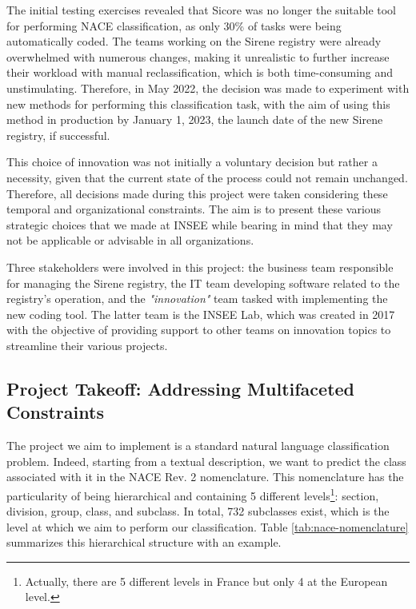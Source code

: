 The initial testing exercises revealed that Sicore was no longer the suitable tool for performing NACE classification, as only 30\% of tasks were being automatically coded. The teams working on the Sirene registry were already overwhelmed with numerous changes, making it unrealistic to further increase their workload with manual reclassification, which is both time-consuming and unstimulating. Therefore, in May 2022, the decision was made to experiment with new methods for performing this classification task, with the aim of using this method in production by January 1, 2023, the launch date of the new Sirene registry, if successful.

This choice of innovation was not initially a voluntary decision but rather a necessity, given that the current state of the process could not remain unchanged. Therefore, all decisions made during this project were taken considering these temporal and organizational constraints. The aim is to present these various strategic choices that we made at INSEE while bearing in mind that they may not be applicable or advisable in all organizations.

Three stakeholders were involved in this project: the business team responsible for managing the Sirene registry, the IT team developing software related to the registry's operation, and the \textit{"innovation"} team tasked with implementing the new coding tool. The latter team is the INSEE Lab, which was created in 2017 with the objective of providing support to other teams on innovation topics to streamline their various projects.

\subsection{Project Takeoff: Addressing Multifaceted Constraints}

The project we aim to implement is a standard natural language classification problem. Indeed, starting from a textual description, we want to predict the class associated with it in the NACE Rev. 2 nomenclature. This nomenclature has the particularity of being hierarchical and containing 5 different levels\footnote{Actually, there are 5 different levels in France but only 4 at the European level.}: section, division, group, class, and subclass. In total, 732 subclasses exist, which is the level at which we aim to perform our classification. Table \ref{tab:nace-nomenclature} summarizes this hierarchical structure with an example.


